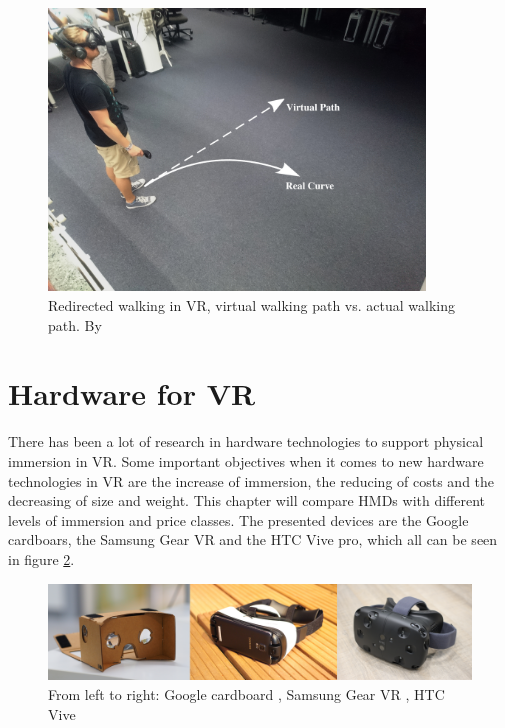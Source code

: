 \begin{figure}[h!]
  \includegraphics[width=10cm]{kapitel/redirected-walking.jpg}
  \centering
  \caption{Redirected walking in VR, virtual walking path vs. actual walking path. By \cite{LS18}}
  \label{fig:walking}
\end{figure}

\section{Hardware for VR}
There has been a lot of research in hardware technologies to support physical immersion in VR. Some important objectives when it comes to new hardware technologies in VR are the increase of immersion, the reducing of costs and the decreasing of size and weight. This chapter will compare HMDs with different levels of immersion and price classes. The presented devices are the Google cardboars, the Samsung Gear VR and the HTC Vive pro, which all can be seen in figure \ref{fig:devices}.

\begin{figure}[h!]
  \includegraphics[width=14cm]{kapitel/hmd-devices.jpg}
  \centering
  \caption{From left to right: Google cardboard \cite{cardboard}, Samsung Gear VR \cite{gearvr}, HTC Vive \cite{vive}}
  \label{fig:devices}
\end{figure}

